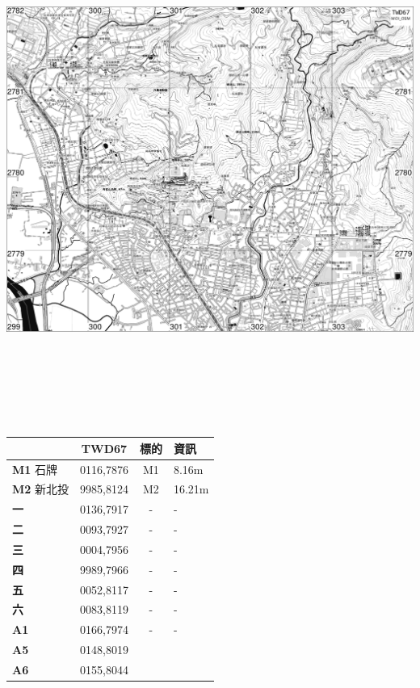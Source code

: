 \documentclass{article}
\begin{document}
\begin{CJK*}{UTF8}{bkai}
\begin{multicols}{2}

\includegraphics[width=20.73cm, height=16.58cm]{osm-map.png}
\begin{tabular}{|l|c|c|l|}
	\hline
	&TWD67&標的&資訊\\  
	\hline
	\textbf{M1} 石牌&0116,7876&M1&8.16m\\
	\textbf{M2} 新北投&9985,8124&M2&16.21m\\
	\hline
	\textbf{一}&0136,7917&-&-\\
	\textbf{二}&0093,7927&-&-\\
	\textbf{三}&0004,7956&-&-\\
	\textbf{四}&9989,7966&-&-\\
	\textbf{五}&0052,8117&-&-\\
	\textbf{六}&0083,8119&-&-\\
	\hline
	\textbf{A1}&0166,7974&-&-\\
	\textbf{A5}&0148,8019& &\\
	\textbf{A6}&0155,8044& & \\

\end{tabular}
\end{multicols}
\end{CJK*}
\end{document}
